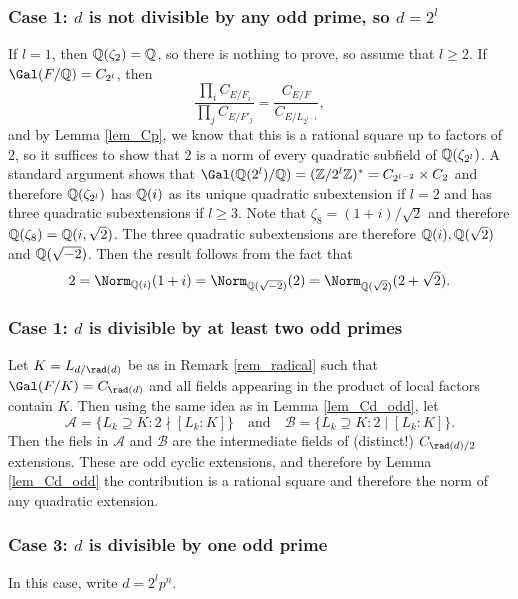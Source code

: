 \subsubsection*{Case 1: $d$ is not divisible by any odd prime, so $d=2^l$}
If $l=1$, then $\mathbb{Q}(\zeta_2)=\mathbb{Q}$, so there is nothing to prove, so assume that $l\geq2$. If $\Gal(F/\QQ)=C_{2^l}$, then 
$$\frac{\prod_i C_{E/F_i}}{\prod_j C_{E/F'_j}}=\frac{C_{E/F}}{C_{E/L_{2^{l-1}}}},$$
and by Lemma \ref*{lem_Cp}, we know that this is a rational square up to factors of $2$, so it suffices to show that $2$ is a norm of every quadratic subfield of $\mathbb{Q}(\zeta_{2^l})$. A standard argument shows that $\Gal(\QQ(2^l)/\QQ)=(\ZZ/2^l\ZZ)^*=C_{2^{l-2}}\times C_2$ and therefore $\mathbb{Q}(\zeta_{2^l})$ has $\mathbb{Q}(i)$ as its unique quadratic subextension if $l=2$ and has three quadratic subextensions if $l\geq 3$. Note that $\zeta_8=(1+i)/\sqrt{2}$ and therefore $\mathbb{Q}(\zeta_8)=\mathbb{Q}(i,\sqrt{2})$. The three quadratic subextensions are therefore $\mathbb{Q}(i), \mathbb{Q}(\sqrt{2})$ and $\mathbb{Q}(\sqrt{-2})$. Then the result follows from the fact that 
$$2=\Norm_{\QQ(i)}(1+i)=\Norm_{\QQ(\sqrt{-2})}(2)=\Norm_{\QQ(\sqrt{2})}(2+\sqrt{2}).$$

\subsubsection*{Case 1: $d$ is divisible by at least two odd primes}
Let $K=L_{d/\rad(d)}$ be as in Remark \ref*{rem_radical} such that $\Gal(F/K)=C_{\rad(d)}$ and all fields appearing in the product of local factors contain $K$. Then using the same idea as in Lemma \ref*{lem_Cd_odd}, let 
$$\mathcal{A}=\{L_k\supseteq K:2\nmid [L_k:K]\}\quad\text{and}\quad\mathcal{B}=\{L_k\supseteq K:2\mid [L_k:K]\}.$$
Then the fiels in $\mathcal{A}$ and $\mathcal{B}$ are the intermediate fields of (distinct!) $C_{\rad(d)/2}$ extensions. These are odd cyclic extensions, and therefore by Lemma \ref*{lem_Cd_odd} the contribution is a rational square and therefore the norm of any quadratic extension.

\subsubsection*{Case 3: $d$ is divisible by one odd prime}
In this case, write $d=2^lp^n$.



